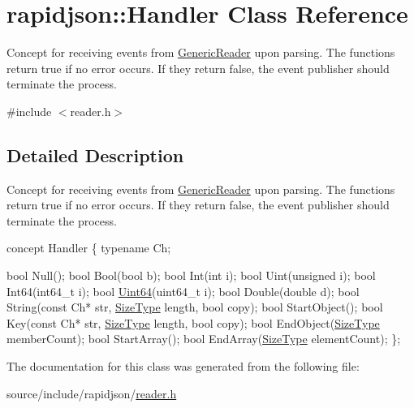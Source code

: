 \hypertarget{classrapidjson_1_1_handler}{}\section{rapidjson\+:\+:Handler Class Reference}
\label{classrapidjson_1_1_handler}


Concept for receiving events from \hyperlink{class_generic_reader}{Generic\+Reader} upon parsing. The functions return true if no error occurs. If they return false, the event publisher should terminate the process.  




{\ttfamily \#include $<$reader.\+h$>$}



\subsection{Detailed Description}
Concept for receiving events from \hyperlink{class_generic_reader}{Generic\+Reader} upon parsing. The functions return true if no error occurs. If they return false, the event publisher should terminate the process. 


\begin{DoxyCode}
concept Handler \{
    \textcolor{keyword}{typename} Ch;

    \textcolor{keywordtype}{bool} Null();
    \textcolor{keywordtype}{bool} Bool(\textcolor{keywordtype}{bool} b);
    \textcolor{keywordtype}{bool} Int(\textcolor{keywordtype}{int} i);
    \textcolor{keywordtype}{bool} Uint(\textcolor{keywordtype}{unsigned} i);
    \textcolor{keywordtype}{bool} Int64(int64\_t i);
    \textcolor{keywordtype}{bool} \hyperlink{_s_d_l__stdinc_8h_ac006cf2bd55a42a9cc8ae9f123aa7e13}{Uint64}(uint64\_t i);
    \textcolor{keywordtype}{bool} Double(\textcolor{keywordtype}{double} d);
    \textcolor{keywordtype}{bool} String(\textcolor{keyword}{const} Ch* str, \hyperlink{rapidjson_8h_a5ed6e6e67250fadbd041127e6386dcb5}{SizeType} length, \textcolor{keywordtype}{bool} copy);
    \textcolor{keywordtype}{bool} StartObject();
    \textcolor{keywordtype}{bool} Key(\textcolor{keyword}{const} Ch* str, \hyperlink{rapidjson_8h_a5ed6e6e67250fadbd041127e6386dcb5}{SizeType} length, \textcolor{keywordtype}{bool} copy);
    \textcolor{keywordtype}{bool} EndObject(\hyperlink{rapidjson_8h_a5ed6e6e67250fadbd041127e6386dcb5}{SizeType} memberCount);
    \textcolor{keywordtype}{bool} StartArray();
    \textcolor{keywordtype}{bool} EndArray(\hyperlink{rapidjson_8h_a5ed6e6e67250fadbd041127e6386dcb5}{SizeType} elementCount);
\};
\end{DoxyCode}
 

The documentation for this class was generated from the following file\+:\begin{DoxyCompactItemize}
\item 
source/include/rapidjson/\hyperlink{reader_8h}{reader.\+h}\end{DoxyCompactItemize}
